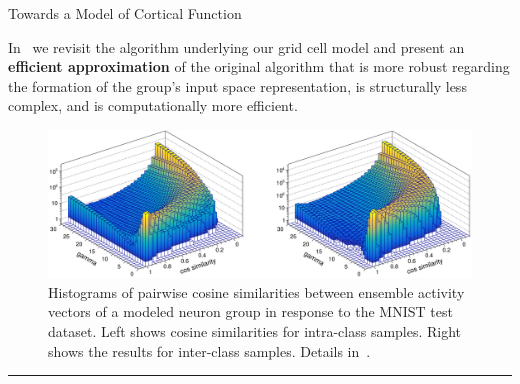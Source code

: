 \begin{frame}{Towards a Model of Cortical Function }

\vspace{0.5em}
\justifying
In~\cite{Kerdels2020} we revisit the algorithm underlying our grid cell model
and present an {\bf efficient approximation} of the original algorithm that is 
more robust regarding the formation of the group’s input space representation, 
is structurally less complex, and is computationally more efficient.

\vspace{1em}

\begin{figure}
\includegraphics[width=0.8\linewidth]{postdiss/patsep.jpg}

\caption{\justifying\scriptsize Histograms of pairwise cosine similarities 
between ensemble activity vectors of a modeled neuron group in response to the 
MNIST test dataset. Left shows cosine similarities for intra-class samples. 
Right shows the results for inter-class samples. Details in~\cite{Kerdels2020}.}
\end{figure}

\begin{center}
\rule{2cm}{0.4pt}\\[0.5em]
\end{center}


\end{frame}




